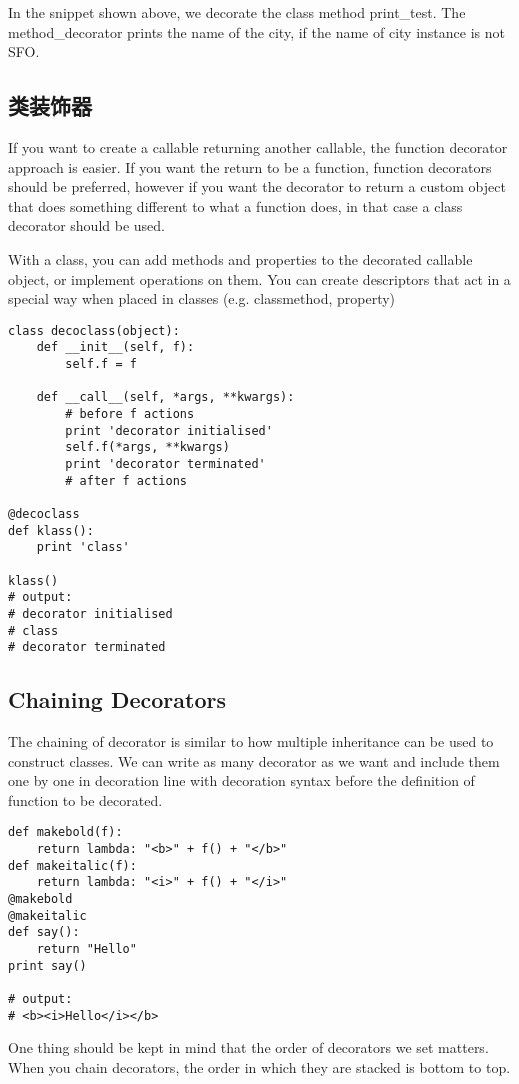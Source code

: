 In the snippet shown above, we decorate the class method print\_test. The method\_decorator prints the name of the city, if the name of city instance is not SFO.

\subsection{类装饰器}
If you want to create a callable returning another callable, the function decorator approach is easier. If you want the return to be a function, function decorators should be preferred, however if you want the decorator to return a custom object that does something different to what a function does, in that case a class decorator should be used.

With a class, you can add methods and properties to the decorated callable object, or implement operations on them. You can create descriptors that act in a special way when placed in classes (e.g. classmethod, property)

\begin{verbatim}
class decoclass(object):
    def __init__(self, f):
        self.f = f

    def __call__(self, *args, **kwargs):
        # before f actions
        print 'decorator initialised'
        self.f(*args, **kwargs)
        print 'decorator terminated'
        # after f actions

@decoclass
def klass():
    print 'class'

klass()
# output:
# decorator initialised
# class
# decorator terminated
\end{verbatim}

\subsection{Chaining Decorators}
The chaining of decorator is similar to how multiple inheritance can be used to construct classes. We can write as many decorator as we want and include them one by one in decoration line with decoration syntax before the definition of function to be decorated.

\begin{verbatim}
def makebold(f):
    return lambda: "<b>" + f() + "</b>"
def makeitalic(f):
    return lambda: "<i>" + f() + "</i>"
@makebold
@makeitalic
def say():
    return "Hello"
print say()

# output:
# <b><i>Hello</i></b>
\end{verbatim}
One thing should be kept in mind that the order of decorators we set matters. When you chain decorators, the order in which they are stacked is bottom to top.


